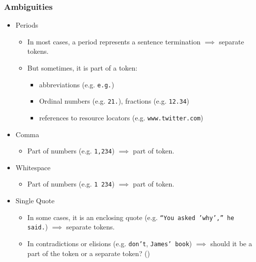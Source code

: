 \documentclass[a4paper, 11pt, accentcolor = tud3b]{tudreport}
\begin{document}
                \subsubsection{Ambiguities} %
                    \begin{itemize}
                    	\item Periods
                    		\begin{itemize}
                    			\item In most cases, a period represents a sentence termination \( \implies \) separate tokens.
                    			\item But sometimes, it is part of a token:
                    				\begin{itemize}
                    					\item abbreviations (e.g. \texttt{e.g.})
                    					\item Ordinal numbers (e.g. \texttt{21.}), fractions (e.g. \texttt{12.34})
                    					\item references to resource locators (e.g. \texttt{www.twitter.com})
                    				\end{itemize}
                    		\end{itemize}
                    	\item Comma
                    		\begin{itemize}
                    			\item Part of numbers (e.g. \texttt{1,234}) \( \implies \) part of token.
                    		\end{itemize}
                    	\item Whitespace
                    		\begin{itemize}
                    			\item Part of numbers (e.g. \texttt{1 234}) \( \implies \) part of token.
                    		\end{itemize}
                    	\item Single Quote
                    		\begin{itemize}
                    			\item In some cases, it is an enclosing quote (e.g. \texttt{\enquote{You asked 'why',} he said.}) \(\implies\) separate tokens.
                    			\item In contradictions or elisions (e.g. \texttt{don't}, \texttt{James' book}) \(\implies\) should it be a part of the token or a separate token? ()

\end{itemize}
\end{itemize}
\end{document}
